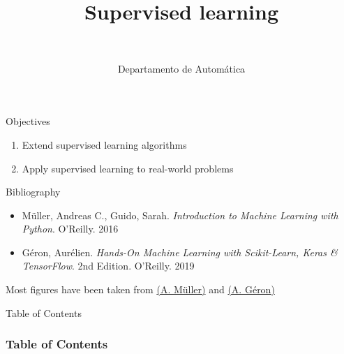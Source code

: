 \documentclass[10pt,compress]{beamer} %
\title[Supervised learning]{Supervised learning}
\author{\asignatura\\\carrera}
\institute{}
\date{Departamento de Automática}
\begin{document}
{\titlepageBlue
    \begin{frame}
        \titlepage
    \end{frame}
}

\institute{\asignatura}

\begin{frame}[plain]{}
   \begin{block}{Objectives}
      \begin{enumerate}
         \item Extend supervised learning algorithms
         \item Apply supervised learning to real-world problems
      \end{enumerate} 
   \end{block}

   \begin{block}{Bibliography}
    \begin{itemize}
        \item M\"uller, Andreas C., Guido, Sarah. \textit{Introduction to Machine Learning with Python}. O'Reilly. 2016
        \item G\'eron, Aur\'elien. \textit{Hands-On Machine Learning with Scikit-Learn, Keras \& TensorFlow}. 2nd Edition. O'Reilly. 2019
    \end{itemize}
   \end{block}
   Most figures have been taken from \href{https://github.com/amueller/introduction_to_ml_with_python/blob/master/02-supervised-learning.ipynb}{(A. M\"uller)} and \href{https://github.com/tuitet/Hands-On-Machine-Learning-with-Scikit-Learn-Keras-and-TensorFlow-3rd-Edition/blob/main/05_support_vector_machines.ipynb}{(A. G\'eron)}
\end{frame}

{
\begin{frame}[shrink]{Table of Contents}

 	\frametitle{Table of Contents}
  	\begin{multicols}{2}
  		\tableofcontents
    \end{multicols}

\end{frame}
}
\end{document}
